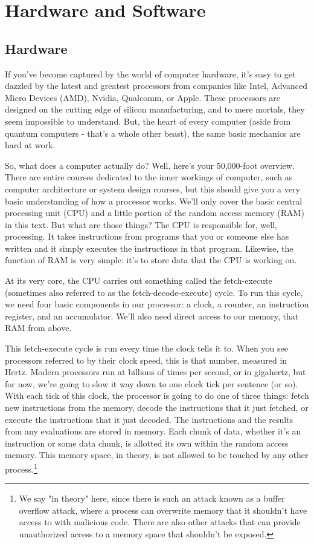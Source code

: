 \section{Hardware and Software}
\subsection{Hardware}
If you've become captured by the world of computer hardware, it's easy to get dazzled by the latest and greatest processors from companies like Intel, Advanced Micro Devices (AMD), Nvidia, Qualcomm, or Apple. These processors are designed on the cutting edge of silicon manufacturing, and to mere mortals, they seem impossible to understand. But, the heart of every computer (aside from quantum computers - that's a whole other beast), the same basic mechanics are hard at work.\par
So, what does a computer actually do? Well, here's your 50,000-foot overview. There are entire courses dedicated to the inner workings of computer, such as computer architecture or system design courses, but this should give you a very basic understanding of how a processor works. We'll only cover the basic central processing unit (CPU) and a little portion of the random access memory (RAM) in this text. But what are those things? The CPU is responsible for, well, processing. It takes instructions from programs that you or someone else has written and it simply executes the instructions in that program. Likewise, the function of RAM is very simple: it's to store data that the CPU is working on.\par
At its very core, the CPU carries out something called the fetch-execute (sometimes also referred to as the fetch-decode-execute) cycle. To run this cycle, we need four basic components in our processor: a clock, a counter, an instruction register, and an accumulator. We'll also need direct access to our memory, that RAM from above.\par
This fetch-execute cycle is run every time the clock tells it to. When you see processors referred to by their clock speed, this is that number, measured in Hertz. Modern processors run at billions of times per second, or in gigahertz, but for now, we're going to slow it way down to one clock tick per sentence (or so). With each tick of this clock, the processor is going to do one of three things: fetch new instructions from the memory, decode the instructions that it just fetched, or execute the instructions that it just decoded.
The instructions and the results from any evaluations are stored in memory. Each chunk of data, whether it's an instruction or some data chunk, is allotted its own  within the random access memory. This memory space, in theory, is not allowed to be touched by any other process.\footnote{We say "in theory" here, since there is such an attack known as a buffer overflow attack, where a process can overwrite memory that it shouldn't have access to with malicious code. There are also other attacks that can provide unauthorized access to a memory space that shouldn't be exposed.}\par

